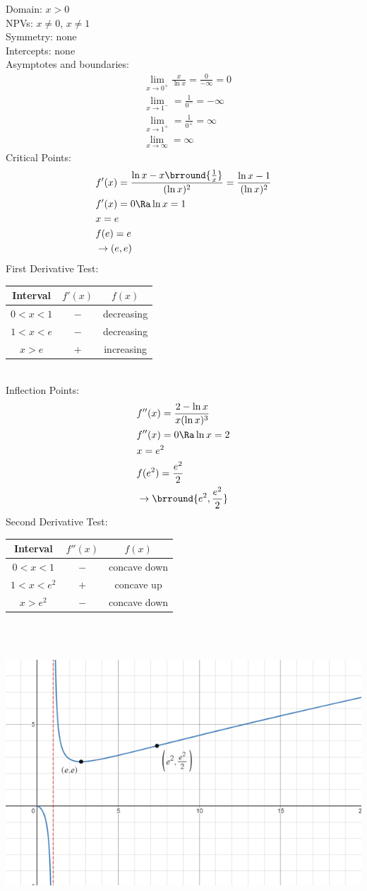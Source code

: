 Domain: $x>0$\\
NPVs: $x\neq 0$, $x\neq 1$\\
Symmetry: none\\
Intercepts: none\\
Asymptotes and boundaries:
\begin{align*}
    &\lim_{x\to 0^+}\frac{x}{\ln x}=\frac{0}{-\infty}=0\\
    &\lim_{x\to 1^-}=\frac{1}{0^-}=-\infty\\
    &\lim_{x\to 1^+}=\frac{1}{0^+}=\infty\\
    &\lim_{x\to \infty}=\infty
\end{align*}
Critical Points:
\begin{align*}
    &f'(x)=\frac{\ln x-x\brround{\frac{1}{x}}}{(\ln x)^2}=\frac{\ln x-1}{(\ln x)^2}\\
    &f'(x)=0\Ra \ln x=1\\
    &x=e\\
    &f(e)=e\\
    &\rightarrow (e,e)
\end{align*}
First Derivative Test:\\
\begin{tabular}{c||c|c}
    Interval & $f'(x)$ & $f(x)$\\
    \hline
    $0<x<1$ & $-$ & decreasing\\
    $1<x<e$ & $-$ & decreasing\\
    $x>e$ & $+$ & increasing
\end{tabular}\\
Inflection Points:
\begin{align*}
    &f''(x)=\frac{2-\ln x}{x(\ln x)^3}\\
    &f''(x)=0\Ra \ln x=2\\
    &x=e^2\\
    &f(e^2)=\frac{e^2}{2}\\
    &\rightarrow \brround{e^2,\frac{e^2}{2}}
\end{align*}
Second Derivative Test:\\
\begin{tabular}{c||c|c}
    Interval & $f''(x)$ & $f(x)$\\
    \hline
    $0<x<1$ & $-$ & concave down\\
    $1<x<e^2$ & $+$ & concave up\\
    $x>e^2$ & $-$ & concave down
\end{tabular}\\
\\
\centerline{\includegraphics[scale=0.9]{DifferentialCalculusPictures/SketchingEx1.png}}
